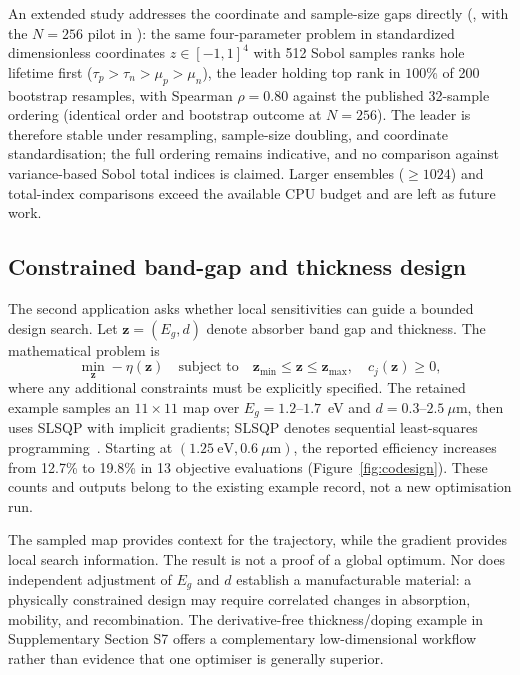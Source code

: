 An extended study addresses the coordinate and sample-size gaps
directly (, with the
$N=256$ pilot in ): the same
four-parameter problem in standardized dimensionless coordinates
$z\in[-1,1]^4$ with 512 Sobol samples ranks hole lifetime first
($\tau_p>\tau_n>\mu_p>\mu_n$), the leader holding top rank in $100\%$
of 200 bootstrap resamples, with Spearman $\rho=0.80$ against the
published 32-sample ordering (identical order and bootstrap outcome at
$N=256$). The leader is therefore stable under resampling, sample-size
doubling, and coordinate standardisation; the full ordering remains
indicative, and no comparison against variance-based Sobol total
indices is claimed. Larger ensembles ($\geq1024$) and total-index
comparisons exceed the available CPU budget and are left as future work.


\subsection{Constrained band-gap and thickness design}
The second application asks whether local sensitivities can guide a
bounded design search. Let $\boldsymbol z=(E_g,d)$ denote absorber
band gap and thickness. The mathematical problem is
\begin{equation}
\min_{\boldsymbol z}-\eta(\boldsymbol z)
\quad\text{subject to}\quad
\boldsymbol z_{\min}\leq\boldsymbol z\leq\boldsymbol z_{\max},
\quad c_j(\boldsymbol z)\geq0,\label{eq:optimisation}
\end{equation}
where any additional constraints must be explicitly specified.
The retained example samples an $11\times11$ map over
$E_g=1.2$--$1.7$~eV and $d=0.3$--$2.5~\mu$m, then uses SLSQP with
implicit gradients; SLSQP denotes sequential least-squares
programming~\cite{scipyslsqp}. Starting at $(1.25~\mathrm{eV},0.6~\mu\mathrm{m})$,
the reported efficiency increases from 12.7\% to 19.8\% in 13 objective
evaluations (Figure~\ref{fig:codesign}). These counts and outputs belong
to the existing example record, not a new optimisation run.

The sampled map provides context for the trajectory, while the gradient
provides local search information. The result is not a proof of a global
optimum. Nor does independent adjustment of $E_g$ and $d$ establish a
manufacturable material: a physically constrained design may require
correlated changes in absorption, mobility, and recombination. The
derivative-free thickness/doping example in Supplementary Section S7
offers a complementary low-dimensional workflow rather than evidence
that one optimiser is generally superior.

